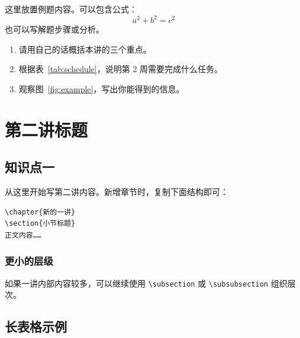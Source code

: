 \documentclass[UTF8,a4paper,zihao=-4,oneside,openany]{ctexbook}
\begin{document}
\begin{examplebox}[1]
  这里放置例题内容。可以包含公式：
  \[
    a^2 + b^2 = c^2
  \]
  也可以写解题步骤或分析。
\end{examplebox}

\begin{exercisebox}
  \begin{enumerate}
    \item 请用自己的话概括本讲的三个重点。
    \item 根据表~\ref{tab:schedule}，说明第 2 周需要完成什么任务。
    \item 观察图~\ref{fig:example}，写出你能得到的信息。
  \end{enumerate}
\end{exercisebox}

\chapter{第二讲标题}

\section{知识点一}

从这里开始写第二讲内容。新增章节时，复制下面结构即可：

\begin{verbatim}
\chapter{新的一讲}
\section{小节标题}
正文内容……
\end{verbatim}

\subsection{更小的层级}

如果一讲内部内容较多，可以继续使用 \verb|\subsection| 或 \verb|\subsubsection| 组织层次。

\section{长表格示例}
\end{document}
